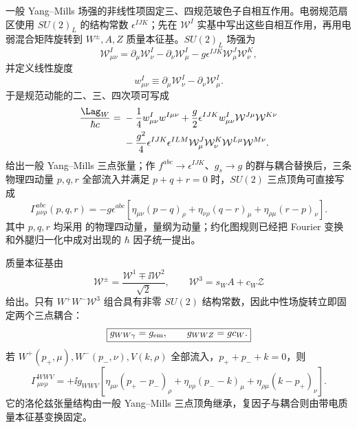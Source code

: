 一般 Yang--Mills 场强的非线性项固定三、四规范玻色子自相互作用。电弱规范扇区使用 $SU(2)_L$ 的结构常数 $\epsilon^{IJK}$；先在 $\mathcal W^I$ 实基中写出这些自相互作用，再用电弱混合矩阵旋转到 $W^\pm,A,Z$ 质量本征基。$SU(2)_L$ 场强为
\begin{equation}
 \mathcal W^I_{\mu\nu}
 =\partial_\mu\mathcal W^I_\nu-\partial_\nu\mathcal W^I_\mu
 -g\epsilon^{IJK}\mathcal W^J_\mu\mathcal W^K_\nu,
 \label{eq:sm-su2-fieldstrength-massrule-dp11}
\end{equation}
并定义线性旋度
\begin{equation*}
 w^I_{\mu\nu}\equiv\partial_\mu\mathcal W^I_\nu-\partial_\nu\mathcal W^I_\mu.
\end{equation*}
于是规范动能的二、三、四次项可写成
\begin{align}
 \frac{\Lag_W}{\hbar c}
 ={}&-\frac14w^I_{\mu\nu}w^{I\mu\nu}
 +\frac g2\epsilon^{IJK}w^I_{\mu\nu}\mathcal W^{J\mu}\mathcal W^{K\nu}
 \nonumber\\
 &-\frac{g^2}{4}\epsilon^{IJK}\epsilon^{ILM}
 \mathcal W^J_\mu\mathcal W^K_\nu
 \mathcal W^{L\mu}\mathcal W^{M\nu}.
 \label{eq:sm-su2-kinetic-expanded-dp11}
\end{align}
 给出一般 Yang--Mills 三点张量；作 $f^{abc}\to\epsilon^{IJK}$、$g_s\to g$ 的群与耦合替换后，三条物理四动量 $p,q,r$ 全部流入并满足 $p+q+r=0$ 时，$SU(2)$ 三点顶角可直接写成
\begin{equation}
 \boxed{
 \Gamma^{abc}_{\mu\nu\rho}(p,q,r)
 =-g\epsilon^{abc}
 \left[
 \eta_{\mu\nu}(p-q)_\rho
 +\eta_{\nu\rho}(q-r)_\mu
 +\eta_{\rho\mu}(r-p)_\nu
 \right].}
 \label{eq:sm-yangmills-three-vertex-dp11}
\end{equation}
其中 $p,q,r$ 均采用 的物理四动量，量纲为动量；约化图规则已经把 Fourier 变换和外腿归一化中成对出现的 $\hbar$ 因子统一提出。

质量本征基由
\begin{equation*}
 \mathcal W^\pm=\frac{\mathcal W^1\mp\ii\mathcal W^2}{\sqrt2},
 \qquad
 \mathcal W^3=s_WA+c_W\mathcal Z
\end{equation*}
给出。只有 $W^+W^-\mathcal W^3$ 组合具有非零 $SU(2)$ 结构常数，因此中性场旋转立即固定两个三点耦合：
\begin{equation}
 \boxed{
 g_{WW\gamma}=g_{\rm em},
 \qquad
 g_{WWZ}=gc_W.}
 \label{eq:sm-wwv-couplings-dp11}
\end{equation}
若 $W^+(p_+,\mu),W^-(p_-,\nu),V(k,\rho)$ 全部流入，$p_++p_-+k=0$，则
\begin{equation}
 \boxed{
 \Gamma^{WWV}_{\mu\nu\rho}
 =+\ii g_{WWV}
 \left[
 \eta_{\mu\nu}(p_+-p_-)_\rho
 +\eta_{\nu\rho}(p_--k)_\mu
 +\eta_{\rho\mu}(k-p_+)_\nu
 \right].}
 \label{eq:sm-wwv-vertex-dp11}
\end{equation}
它的洛伦兹张量结构由一般 Yang--Mills 三点顶角继承，复因子与耦合则由带电质量本征基变换固定。


